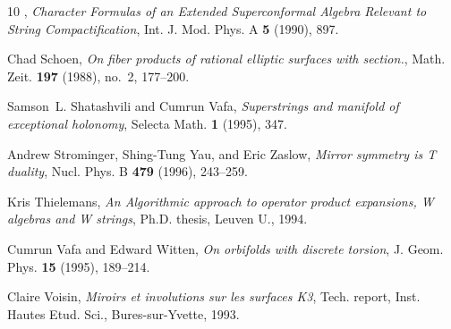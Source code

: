 \documentclass{pspum-l}
\theoremstyle{definition}
\theoremstyle{remark}
\numberwithin{equation}{section}
\begin{document}
\begin{thebibliography}{10}
\bysame, \emph{{Character Formulas of an Extended Superconformal Algebra
  Relevant to String Compactification}}, Int. J. Mod. Phys. A \textbf{5}
  (1990), 897.

Chad Schoen, \emph{On fiber products of rational elliptic surfaces with
  section.}, Math. Zeit. \textbf{197} (1988), no.~2, 177--200.

Samson~L. Shatashvili and Cumrun Vafa, \emph{{Superstrings and manifold of
  exceptional holonomy}}, Selecta Math. \textbf{1} (1995), 347.

Andrew Strominger, Shing-Tung Yau, and Eric Zaslow, \emph{{Mirror symmetry is T
  duality}}, Nucl. Phys. B \textbf{479} (1996), 243--259.

Kris Thielemans, \emph{{An Algorithmic approach to operator product expansions,
  W algebras and W strings}}, Ph.D. thesis, Leuven U., 1994.

Cumrun Vafa and Edward Witten, \emph{{On orbifolds with discrete torsion}}, J.
  Geom. Phys. \textbf{15} (1995), 189--214.

Claire Voisin, \emph{{Miroirs et involutions sur les surfaces K3}}, Tech.
  report, Inst. Hautes Etud. Sci., Bures-sur-Yvette, 1993.

\end{thebibliography}
\end{document}
